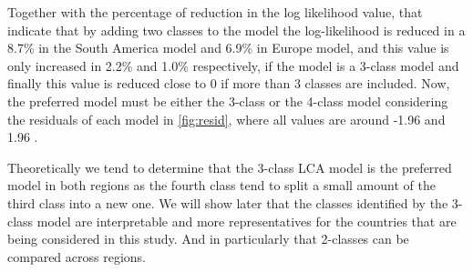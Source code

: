 \documentclass[12pt,twoside]{reedthesis}
\begin{document}
Together with the percentage of reduction in the log likelihood value, that indicate that by adding two classes to the model the log-likelihood is reduced in a 8.7\% in the South America model and 6.9\% in Europe model, and this value is only increased in 2.2\% and 1.0\% respectively, if the model is a 3-class model and finally this value is reduced close to 0 if more than 3 classes are included.
\newline 
Now, the preferred model must be either the 3-class or the 4-class model considering the residuals of each model in \ref{fig:resid}, where all values are around -1.96 and 1.96 .

Theoretically we tend to determine that the 3-class LCA model is the preferred model in both regions as the fourth class tend to split a small amount of the third class into a new one. We will show later that the classes identified by the 3-class model are interpretable and more representatives for the countries that are being considered in this study. And in particularly that 2-classes can be compared across regions.
\end{document}
